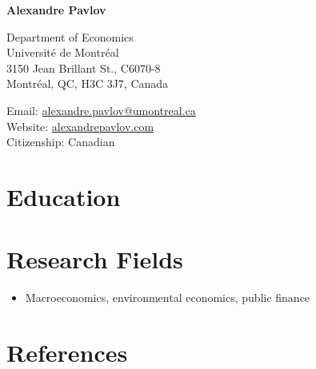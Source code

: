 \documentclass[11pt,letterpaper]{article}
\def\name{Alexandre Pavlov}
\newcommand{\when}[1]{{\unskip\nobreak\hfil\penalty50\hskip1em\hbox{}\nobreak\hfill #1%
  \parfillskip=0pt\finalhyphendemerits=0\par}}
\begin{document}
\centerline{\huge \bf \name}

\vspace{0.5cm}

\begin{minipage}[t]{0.48\textwidth}
Department of Economics\\
Université de Montréal\\
3150 Jean Brillant St., C6070-8\\
Montréal, QC, H3C 3J7, Canada
\end{minipage}
\hfill
\begin{minipage}[t]{0.48\textwidth}
Email: \href{mailto:alexandre.pavlov@umontreal.ca}{alexandre.pavlov@umontreal.ca}\\
Website: \href{https://alexandrepavlov.com/}{alexandrepavlov.com}\\
Citizenship: Canadian
\end{minipage}

\vspace{0.3cm}

\hrulefill

\section*{Education}


\section*{Research Fields}

\begin{itemize}
\item Macroeconomics, environmental economics, public finance
\end{itemize}

\section*{References}
\end{document}
